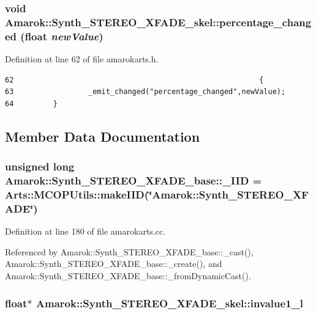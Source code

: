 \subsubsection{\setlength{\rightskip}{0pt plus 5cm}void Amarok::Synth\_\-STEREO\_\-XFADE\_\-skel::percentage\_\-changed (float {\em new\-Value})\hspace{0.3cm}{\tt  [inline, protected]}}\label{classAmarok_1_1Synth__STEREO__XFADE__skel_Amarok_1_1Synth__STEREO__XFADE__skelb0}




Definition at line 62 of file amarokarts.h.



\footnotesize\begin{verbatim}62                                                        {
63                 _emit_changed("percentage_changed",newValue);
64         }
\end{verbatim}\normalsize 


\subsection{Member Data Documentation}
\subsubsection{\setlength{\rightskip}{0pt plus 5cm}unsigned long {\bf Amarok::Synth\_\-STEREO\_\-XFADE\_\-base::\_\-IID} = Arts::MCOPUtils::make\-IID(\char`\"{}Amarok::Synth\_\-STEREO\_\-XFADE\char`\"{})\hspace{0.3cm}{\tt  [static, inherited]}}\label{classAmarok_1_1Synth__STEREO__XFADE__base_Amarok_1_1Synth__STEREO__XFADE__stubs0}




Definition at line 180 of file amarokarts.cc.

Referenced by Amarok::Synth\_\-STEREO\_\-XFADE\_\-base::\_\-cast(), Amarok::Synth\_\-STEREO\_\-XFADE\_\-base::\_\-create(), and Amarok::Synth\_\-STEREO\_\-XFADE\_\-base::\_\-from\-Dynamic\-Cast().
\subsubsection{\setlength{\rightskip}{0pt plus 5cm}float$\ast$ {\bf Amarok::Synth\_\-STEREO\_\-XFADE\_\-skel::invalue1\_\-l}\hspace{0.3cm}{\tt  [protected]}}\label{classAmarok_1_1Synth__STEREO__XFADE__skel_Amarok_1_1Synth__STEREO__XFADE__skelp0}





